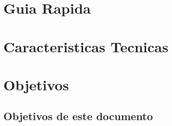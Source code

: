 \documentclass{DccDiyTools}
\begin{document}
\section{Guia Rapida}

\section{Caracteristicas Tecnicas}

\section{Objetivos}
\subsection{Objetivos de este documento}

\end{document}
